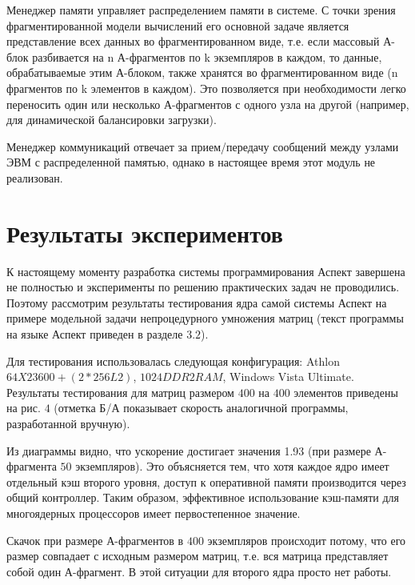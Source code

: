 \documentclass[a4paper,11pt]{article} %
\begin{document}
	Менеджер памяти управляет распределением памяти в системе. С точки зрения фрагментированной модели вычислений его основной задаче является представление всех данных во фрагментированном виде, т.е. если массовый А-блок разбивается на n А-фрагментов по k экземпляров
	в каждом, то данные, обрабатываемые этим А-блоком, также хранятся во фрагментированном
	виде (n фрагментов по k элементов в каждом). Это позволяется при необходимости легко переносить один или несколько А-фрагментов с одного узла на другой (например, для динамической
	балансировки загрузки).
	
	Менеджер коммуникаций отвечает за прием/передачу сообщений между узлами ЭВМ с распределенной памятью, однако в настоящее время этот модуль не реализован.
	
	\section{Результаты экспериментов}
	К настоящему моменту разработка системы программирования Аспект завершена не полностью
	и эксперименты по решению практических задач не проводились. Поэтому рассмотрим результаты тестирования ядра самой системы Аспект на примере модельной задачи непроцедурного
	умножения матриц (текст программы на языке Аспект приведен в разделе $3.2$).
	
	Для тестирования использовалась следующая конфигурация: Athlon $64 X2 3600+ (2*256 L2)$,
	$1024 DDR2 RAM$, Windows Vista Ultimate. Результаты тестирования для матриц размером $400$ на
	$400$ элементов приведены на рис. $4$ (отметка Б/А показывает скорость аналогичной программы,
	разработанной вручную).
	
	Из диаграммы видно, что ускорение достигает значения 1.93 (при размере А-фрагмента $50$
	экземпляров). Это объясняется тем, что хотя каждое ядро имеет отдельный кэш второго уровня,
	доступ к оперативной памяти производится через общий контроллер. Таким образом, эффективное использование кэш-памяти для многоядерных процессоров имеет первостепенное \mbox{значение.}
	
	Скачок при размере А-фрагментов в $400$ экземпляров происходит потому, что его размер
	совпадает с исходным размером матриц, т.е. вся матрица представляет собой один А-фрагмент.
	В этой ситуации для второго ядра просто нет работы.
	
\end{document}
